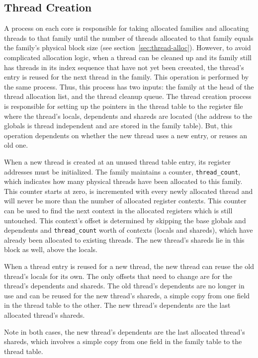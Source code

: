 \subsection{Thread Creation}
A process on each core is responsible for taking allocated families and allocating threads to that family until the number of threads allocated to that family equals the family's physical block size (see section~\ref{sec:thread-alloc}). However, to avoid complicated allocation logic, when a thread can be cleaned up and its family still has threads in its index sequence that have not yet been creeated, the thread's entry is reused for the next thread in the family. This operation is performed by the same process. Thus, this process has two inputs: the family at the head of the thread allocation list, and the thread cleanup queue. The thread creation process is responsible for setting up the pointers in the thread table to the register file where the thread's locals, dependents and shareds are located (the address to the globals is thread independent and are stored in the family table). But, this operation dependents on whether the new thread uses a new entry, or reuses an old one.

When a new thread is created at an unused thread table entry, its register addresses must be initialized. The family maintains a counter, {\tt thread\_count}, which indicates how many physical threads have been allocated to this family. This counter starts at zero, is incremented with every newly allocated thread and will never be more than the number of allocated register contexts. This counter can be used to find the next context in the allocated registers which is still untouched. This context's offset is determined by skipping the base globals and dependents and {\tt thread\_count} worth of contexts (locals and shareds), which have already been allocated to existing threads. The new thread's shareds lie in this block as well, above the locals. 

When a thread entry is reused for a new thread, the new thread can reuse the old thread's locals for its own. The only offsets that need to change are for the thread's dependents and shareds. The old thread's dependents are no longer in use and can be reused for the new thread's shareds, a simple copy from one field in the thread table to the other. The new thread's dependents are the last allocated thread's shareds.

Note in both cases, the new thread's dependents are the last allocated thread's shareds, which involves a simple copy from one field in the family table to the thread table.